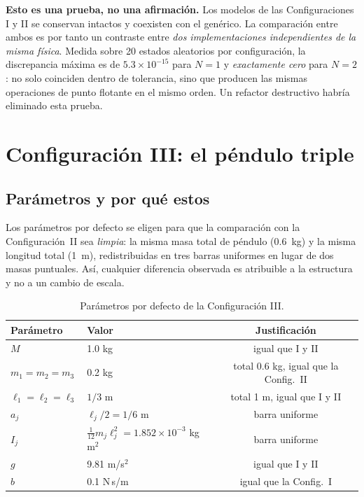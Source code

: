 \documentclass[11pt,letterpaper]{article}
\theoremstyle{definition}
\theoremstyle{plain}
\theoremstyle{remark}
\begin{document}
\begin{clave}
\small
\textbf{Esto es una prueba, no una afirmación.} Los modelos de las
Configuraciones I y II se conservan intactos y coexisten con el genérico. La
comparación entre ambos es por tanto un contraste entre \emph{dos
implementaciones independientes de la misma física}. Medida sobre 20 estados
aleatorios por configuración, la discrepancia máxima es de $5.3\times10^{-15}$
para $N=1$ y \emph{exactamente cero} para $N=2$: no solo coinciden dentro de
tolerancia, sino que producen las mismas operaciones de punto flotante en el
mismo orden. Un refactor destructivo habría eliminado esta prueba.
\end{clave}

\section{Configuración III: el péndulo triple}
\label{sec:configiii}

\subsection{Parámetros y por qué estos}

Los parámetros por defecto se eligen para que la comparación con la
Configuración~II sea \emph{limpia}: la misma masa total de péndulo (0.6~kg) y la
misma longitud total (1~m), redistribuidas en tres barras uniformes en lugar de
dos masas puntuales. Así, cualquier diferencia observada es atribuible a la
estructura y no a un cambio de escala.

\begin{table}[htbp]
  \centering\small
  \caption{Parámetros por defecto de la Configuración III.}
  \label{tab:paramsiii}
  \begin{tabular}{@{}llc@{}}
    \toprule
    \textbf{Parámetro} & \textbf{Valor} & \textbf{Justificación}\\
    \midrule
    $M$ & 1.0 kg & igual que I y II\\
    $m_1=m_2=m_3$ & 0.2 kg & total 0.6 kg, igual que la Config.~II\\
    $\ell_1=\ell_2=\ell_3$ & $1/3$ m & total 1 m, igual que I y II\\
    $a_j$ & $\ell_j/2=1/6$ m & barra uniforme\\
    $I_j$ & $\tfrac{1}{12}m_j\ell_j^2=1.852\times10^{-3}$ kg\,m$^2$ & barra uniforme\\
    $g$ & 9.81 m/s$^2$ & igual que I y II\\
    $b$ & 0.1 N\,s/m & igual que la Config.~I\\
    \bottomrule
  \end{tabular}
\end{table}
\end{document}
